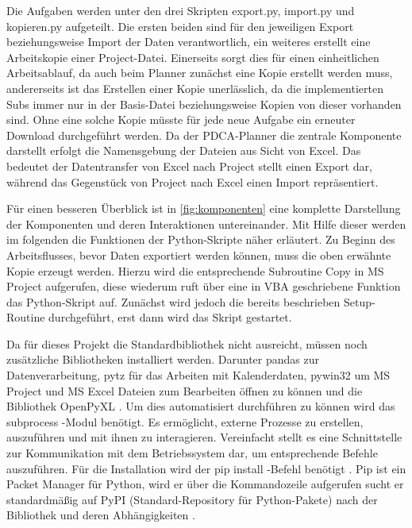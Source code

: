 \documentclass[11pt,a4paper]{report}
\begin{document}
\noindent
Die Aufgaben werden unter den drei Skripten \glqq export.py\grqq{}, \glqq import.py \grqq{} und \glqq kopieren.py\grqq{} aufgeteilt. Die ersten beiden sind für den jeweiligen Export beziehungsweise Import der Daten verantwortlich, ein weiteres erstellt eine Arbeitskopie einer Project-Datei. Einerseits sorgt dies für einen einheitlichen Arbeitsablauf, da auch beim Planner zunächst eine Kopie erstellt werden muss, andererseits ist das Erstellen einer Kopie unerlässlich, da die implementierten Subs immer nur in der Basis-Datei beziehungsweise Kopien von dieser vorhanden sind. Ohne eine solche Kopie müsste für jede neue Aufgabe ein erneuter Download durchgeführt werden. Da der PDCA-Planner die zentrale Komponente darstellt erfolgt die Namensgebung der Dateien aus Sicht von Excel. Das bedeutet der Datentransfer von Excel nach Project stellt einen Export dar, während das Gegenstück von Project nach Excel einen Import repräsentiert.

\noindent
Für einen besseren Überblick ist in \ref{fig:komponenten} eine komplette Darstellung der Komponenten und deren Interaktionen untereinander. Mit Hilfe dieser werden im folgenden die Funktionen der Python-Skripte näher erläutert. Zu Beginn des Arbeitsflusses, bevor Daten exportiert werden können, muss die oben erwähnte Kopie erzeugt werden. Hierzu wird die entsprechende Subroutine \glqq Copy \grqq{} in MS Project aufgerufen, diese wiederum ruft über eine in VBA geschriebene Funktion das Python-Skript auf. Zunächst wird jedoch die bereits beschrieben Setup-Routine durchgeführt, erst dann wird das Skript gestartet.

\noindent
Da für dieses Projekt die Standardbibliothek nicht ausreicht, müssen noch zusätzliche Bibliotheken installiert werden. Darunter \glqq pandas \grqq{} zur Datenverarbeitung, \glqq pytz \grqq{} für das Arbeiten mit Kalenderdaten, \glqq pywin32 \grqq{} um MS Project und MS Excel Dateien zum Bearbeiten öffnen zu können und die Bibliothek \glqq OpenPyXL \grqq{}. Um dies automatisiert durchführen zu können wird das \glqq subprocess \grqq{}-Modul benötigt. Es ermöglicht, externe Prozesse zu erstellen, auszuführen und mit ihnen zu interagieren. Vereinfacht stellt es eine Schnittstelle zur Kommunikation mit dem Betriebssystem dar, um entsprechende Befehle auszuführen. Für die Installation wird der \glqq pip install \grqq{}-Befehl benötigt \cite{pip_command}. Pip ist ein Packet Manager für Python, wird er über die Kommandozeile aufgerufen sucht er standardmäßig auf PyPI (Standard-Repository für Python-Pakete) nach der Bibliothek und deren Abhängigkeiten \cite{pip_command}.
\end{document}
